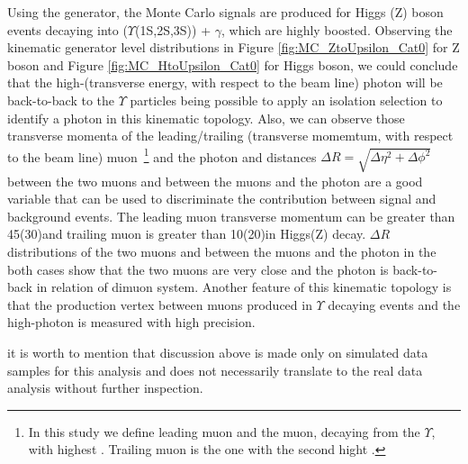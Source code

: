 Using the  generator, the Monte Carlo signals are produced for Higgs (Z) boson events decaying into ($\Upsilon$(1S,2S,3S)) + $\gamma$, which are highly boosted. Observing the kinematic generator level distributions in Figure \ref{fig:MC_ZtoUpsilon_Cat0} for Z boson and Figure \ref{fig:MC_HtoUpsilon_Cat0} for Higgs boson, we could conclude that the high-\ET (transverse energy, with respect to the beam line) photon will be back-to-back to the $\Upsilon$ particles being possible to apply an isolation selection to identify a photon in this kinematic topology. Also, we can observe those transverse momenta of the leading/trailing \PT (transverse momemtum, with respect to the beam line) muon~\footnote{In this study we define leading muon and the muon, decaying from the $\Upsilon$, with highest \PT. Trailing muon is the one with the second hight \PT.} and the photon and distances $\Delta R=\sqrt{\Delta\eta^2 + \Delta\phi^2}$ between the two muons and between the muons and the photon are a good variable that can be used to discriminate the contribution between signal and background events. The leading muon transverse momentum can be greater than 45(30)\GeV and trailing muon is greater than 10(20)\GeV in Higgs(Z) decay. $\Delta R$ distributions of the two muons and between the muons and the photon in the both cases show that the two muons are very close and the photon is back-to-back in relation of dimuon system. Another feature of this kinematic topology is that the production vertex between muons produced in $\Upsilon$ decaying events and the high-\ET photon is measured with high precision.  

it is worth to mention that discussion above is made only on simulated data samples for this analysis and does not necessarily translate to the real data analysis without further inspection.


